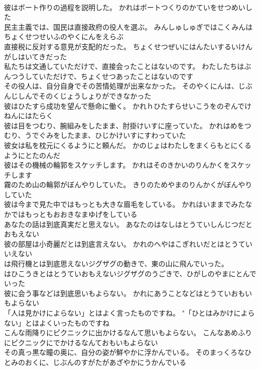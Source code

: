 \documentclass[8pt]{extreport}
\begin{document}
\begin{CJK}{UTF8}{min}
\\	彼はボート作りの過程を説明した。	かれはボートつくりのかていをせつめいした 
\\	民主主義では、国民は直接政府の役人を選ぶ。	みんしゅしゅぎではこくみんはちょくせつせいふのやくにんをえらぶ 
\\	直接税に反対する意見が支配的だった。	ちょくせつぜいにはんたいするいけんがしはいてきだった 
\\	私たちは文通していただけで、直接会ったことはないのです。	わたしたちはぶんつうしていただけで、ちょくせつあったことはないのです 
\\	その役人は、自分自身でその苦情処理が出来なかった。	そのやくにんは、じぶんじしんでそのくじょうしょりができなかった 
\\	彼はひたすら成功を望んで懸命に働く。	かれｈひたすらせいこうをのぞんでけねんにはたらく 
\\	彼は目をつむり、腕組みをしたまま、肘掛けいすに座っていた。	かれはめをつむり、うでぐみをしたまま、ひじかけいすにすわっていた 
\\	彼女は私を枕元にくるようにと頼んだ。	かのじょはわたしをまくらもとにくるようにとたのんだ 
\\	彼はその機械の輪郭をスケッチします。	かれはそのきかいのりんかくをスケッチします 
\\	霧のため山の輪郭がぼんやりしていた。	きりのためやまのりんかくがぼんやりしていた 
\\	彼は今まで見た中ではもっとも大きな眉毛をしている。	かれはいままでみたなかではもっともおおきなまゆげをしている 
\\	あなたの話は到底真実だと思えない。	あなたのはなしはとうていしんじつだとおもえない 
\\	彼の部屋は小奇麗だとは到底言えない。	かれのへやはこぎれいだとはとうていいえない 
\\	は飛行機とは到底思えないジグザグの動きで、東の山に飛んでいった。	
\\	はひこうきとはとうていおもえないジグザグのうごきで、ひがしのやまにとんでいった 
\\	彼に会う事などは到底思いもよらない。	かれにあうことなどはとうていおもいもよらない 
\\	「人は見かけによらない」とはよく言ったものですね。	"「ひとはみかけによらない」とはよくいったものですね 
\\	こんな雨降りにピクニックに出かけるなんて思いもよらない。	こんなあめふりにピクニックにでかけるなんておもいもよらない 
\\	その真っ黒な瞳の奥に、自分の姿が鮮やかに浮かんでいる。	そのまっくろなひとみのおくに、じぶんのすがたがあざやかにうかんでいる 

\end{CJK}
\end{document}

